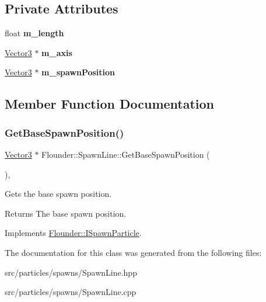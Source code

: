 \subsection*{Private Attributes}
\begin{DoxyCompactItemize}
\item 
\mbox{\label{class_flounder_1_1_spawn_line_a128bccf73eaa4e4291f8316524b7ff29}} 
float {\bfseries m\+\_\+length}
\item 
\mbox{\label{class_flounder_1_1_spawn_line_a968dd4ab80b7cb7da1e2c4a87d28f912}} 
\hyperlink{class_flounder_1_1_vector3}{Vector3} $\ast$ {\bfseries m\+\_\+axis}
\item 
\mbox{\label{class_flounder_1_1_spawn_line_a69e50fddc0926d42fa671f05e0efde9c}} 
\hyperlink{class_flounder_1_1_vector3}{Vector3} $\ast$ {\bfseries m\+\_\+spawn\+Position}
\end{DoxyCompactItemize}


\subsection{Member Function Documentation}
\mbox{\label{class_flounder_1_1_spawn_line_a02c7783fe92ef1845953d5459f7bad7b}} 
\subsubsection{\texorpdfstring{Get\+Base\+Spawn\+Position()}{GetBaseSpawnPosition()}}
{\footnotesize\ttfamily \hyperlink{class_flounder_1_1_vector3}{Vector3} $\ast$ Flounder\+::\+Spawn\+Line\+::\+Get\+Base\+Spawn\+Position (\begin{DoxyParamCaption}{ }\end{DoxyParamCaption})\hspace{0.3cm}{\ttfamily [override]}, {\ttfamily [virtual]}}



Gets the base spawn position. 

\begin{DoxyReturn}{Returns}
The base spawn position. 
\end{DoxyReturn}


Implements \hyperlink{class_flounder_1_1_i_spawn_particle_ac4adda7b65431918162f52ac1f4ce57d}{Flounder\+::\+I\+Spawn\+Particle}.



The documentation for this class was generated from the following files\+:\begin{DoxyCompactItemize}
\item 
src/particles/spawns/Spawn\+Line.\+hpp\item 
src/particles/spawns/Spawn\+Line.\+cpp\end{DoxyCompactItemize}

